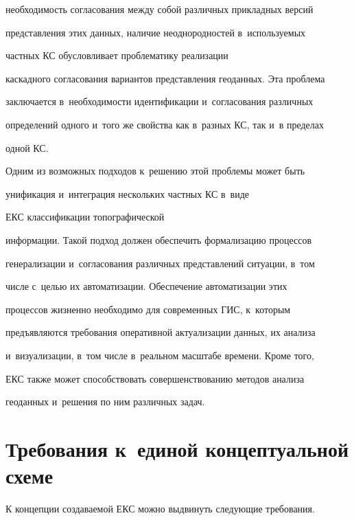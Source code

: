 необходимость согласования между собой различных прикладных версий 


представления этих данных, наличие неоднородностей в~используемых 


частных КС обусловливает проблематику реализации 


каскадного согласования вариантов представления геоданных. Эта проблема 


заключается в~необходимости идентификации и~согласования различных 


определений одного и~того же свойства как в~разных КС, так и~в пределах 


одной КС.


  


  Одним из возможных подходов к~решению этой проблемы может быть 


унификация и~интеграция нескольких частных КС в~виде 


ЕКС классификации топографической 


информации. Такой подход должен обеспечить формализацию процессов 


генерализации и~согласования различных представлений ситуации, в~том 


числе с~целью их автоматизации. Обеспечение автоматизации этих 


процессов жизненно необходимо для современных ГИС, к~которым 


предъявляются требования оперативной актуализации данных, их анализа 


и~визуализации, в~том числе в~реальном масштабе времени. Кроме того, 


ЕКС также может способствовать совершенствованию методов анализа 


геоданных и~решения по ним различных задач.


     


     \section{Требования к~единой концептуальной схеме}


     


  К концепции создаваемой ЕКС можно выдвинуть следующие требования.



